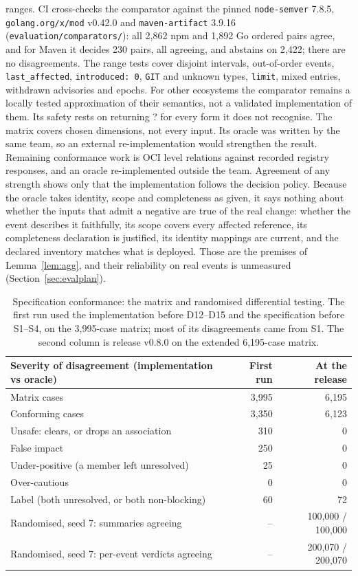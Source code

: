 \documentclass[11pt,a4paper]{article}
\newcommand{\code}[1]{\texttt{#1}}
\newcommand{\Ind}{\textsf{?}}
\newcommand{\release}{v0.8.0}
\begin{document}
ranges. CI cross-checks the comparator against the pinned
\code{node-semver} 7.8.5, \code{golang.org/x/mod} v0.42.0 and
\code{maven-artifact} 3.9.16 (\code{evaluation/comparators/}): all
2{,}862 npm and 1{,}892 Go ordered pairs agree, and for Maven it
decides 230 pairs, all agreeing, and abstains on 2{,}422; there are no
disagreements. The range tests cover disjoint intervals, out-of-order
events, \code{last\_affected}, \code{introduced: 0}, \code{GIT} and
unknown types, \code{limit}, mixed entries, withdrawn advisories and
epochs. For other ecosystems the comparator remains a locally tested
approximation of their semantics, not a validated implementation of
them. Its safety rests on returning \Ind{} for every form it does not
recognise. The matrix covers
chosen dimensions, not every input. Its oracle was written by the same
team, so an external re-implementation would strengthen the result.
Remaining conformance work is OCI level relations against recorded
registry responses, and an oracle re-implemented outside the team.
Agreement of any strength shows only that the implementation follows
the decision policy. Because the oracle takes identity, scope and
completeness as given, it says nothing about whether the inputs that
admit a negative are true of the real change: whether the event
describes it faithfully, its scope covers every affected reference,
its completeness declaration is justified, its identity mappings are
current, and the declared inventory matches what is deployed. Those
are the premises of Lemma~\ref{lem:agg}, and their reliability on real events is
unmeasured (Section~\ref{sec:evalplan}).

\begin{table}[t]
\centering
\footnotesize
\begin{tabularx}{\linewidth}{@{}X r r@{}}
\toprule
Severity of disagreement (implementation vs oracle) & First run & At the release \\
\midrule
Matrix cases & 3{,}995 & 6{,}195 \\
Conforming cases & 3{,}350 & 6{,}123 \\
Unsafe: clears, or drops an association & 310 & 0 \\
False impact & 250 & 0 \\
Under-positive (a member left unresolved) & 25 & 0 \\
Over-cautious & 0 & 0 \\
Label (both unresolved, or both non-blocking) & 60 & 72 \\
\midrule
Randomised, seed 7: summaries agreeing & -- & 100{,}000 / 100{,}000 \\
Randomised, seed 7: per-event verdicts agreeing & -- & 200{,}070 / 200{,}070 \\
\bottomrule
\end{tabularx}
\caption{Specification conformance: the matrix and randomised
differential testing. The first run used the implementation before
D12--D15 and the specification before S1--S4, on the 3{,}995-case
matrix; most of its disagreements came from S1. The second column is
release \release{} on the extended 6{,}195-case matrix.}
\label{tab:conformance}
\end{table}
\end{document}

